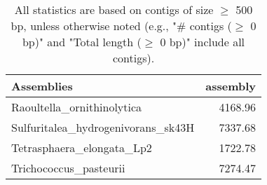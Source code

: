\documentclass[12pt,a4paper]{article}
\begin{document}
\begin{table}[ht]
\begin{center}
\caption{All statistics are based on contigs of size $\geq$ 500 bp, unless otherwise noted (e.g., "\# contigs ($\geq$ 0 bp)" and "Total length ($\geq$ 0 bp)" include all contigs).}
\begin{tabular}{|l*{1}{|r}|}
\hline
Assemblies & assembly \\ \hline
Raoultella\_ornithinolytica & 4168.96 \\ \hline
Sulfuritalea\_hydrogenivorans\_sk43H & 7337.68 \\ \hline
Tetrasphaera\_elongata\_Lp2 & 1722.78 \\ \hline
Trichococcus\_pasteurii & 7274.47 \\ \hline
\end{tabular}
\end{center}
\end{table}
\end{document}
